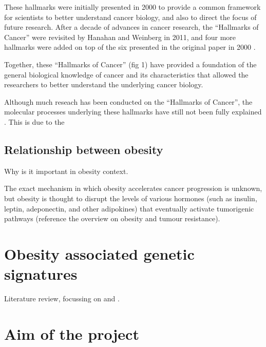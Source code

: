 These hallmarks were initially presented in 2000 to provide a common framework for scientists to better understand cancer biology, and also to direct the focus of future research.
After a decade of advances in cancer research, the ``Hallmarks of Cancer'' were revisited by Hanahan and Weinberg in 2011, and four more hallmarks were added on top of the six presented in the original paper in 2000 \citep{Hanahan2011}.

Together, these ``Hallmarks of Cancer'' (fig 1) have provided a foundation of the general biological knowledge of cancer and its characteristics that allowed the researchers to better understand the underlying cancer biology.

Although much reseach has been conducted on the ``Hallmarks of Cancer'', the molecular processes underlying these hallmarks have still not been fully explained \citep{Hanahan2011}.
This is due to the 


\subsection{Relationship between obesity}
\label{subsec:obsbackground}

Why is it important in obesity context.

The exact mechanism in which obesity accelerates cancer progression is unknown, but obesity is thought to disrupt the levels of various hormones (such as insulin, leptin, adeponectin, and other adipokines) that eventually activate tumorigenic pathways (reference the overview on obesity and tumour resistance).

\section{Obesity associated genetic signatures}
\label{sec:obsgene}

Literature review, focussing on \citet{Creighton2012} and \citet{Fuentes-Mattei2014}.

\section{Aim of the project}
\label{sec:aim}




\newpage

